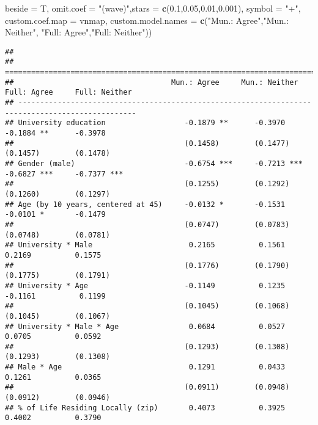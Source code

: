 \documentclass[
]{article}
\newenvironment{Shaded}{\begin{snugshade}}{\end{snugshade}}
\newcommand{\DataTypeTok}[1]{\textcolor[rgb]{0.13,0.29,0.53}{#1}}
\newcommand{\FloatTok}[1]{\textcolor[rgb]{0.00,0.00,0.81}{#1}}
\newcommand{\KeywordTok}[1]{\textcolor[rgb]{0.13,0.29,0.53}{\textbf{#1}}}
\newcommand{\NormalTok}[1]{#1}
\newcommand{\StringTok}[1]{\textcolor[rgb]{0.31,0.60,0.02}{#1}}
\begin{document}
\begin{Shaded}
\begin{Highlighting}[]
          \DataTypeTok{beside =}\NormalTok{ T,}
          \DataTypeTok{omit.coef =} \StringTok{"(wave)"}\NormalTok{,}\DataTypeTok{stars =} \KeywordTok{c}\NormalTok{(}\FloatTok{0.1}\NormalTok{,}\FloatTok{0.05}\NormalTok{,}\FloatTok{0.01}\NormalTok{,}\FloatTok{0.001}\NormalTok{), }\DataTypeTok{symbol =} \StringTok{"+"}\NormalTok{,}
          \DataTypeTok{custom.coef.map =}\NormalTok{ vnmap,}
          \DataTypeTok{custom.model.names =} \KeywordTok{c}\NormalTok{(}\StringTok{"Mun.: Agree"}\NormalTok{,}\StringTok{"Mun.: Neither"}\NormalTok{,}
                                 \StringTok{"Full: Agree"}\NormalTok{,}\StringTok{"Full: Neither"}\NormalTok{))}
\end{Highlighting}
\end{Shaded}

\begin{verbatim}
## 
## =================================================================================================
##                                    Mun.: Agree     Mun.: Neither   Full: Agree     Full: Neither 
## -------------------------------------------------------------------------------------------------
## University education                  -0.1879 **      -0.3970         -0.1884 **      -0.3978    
##                                       (0.1458)        (0.1477)        (0.1457)        (0.1478)   
## Gender (male)                         -0.6754 ***     -0.7213 ***     -0.6827 ***     -0.7377 ***
##                                       (0.1255)        (0.1292)        (0.1260)        (0.1297)   
## Age (by 10 years, centered at 45)     -0.0132 *       -0.1531         -0.0101 *       -0.1479    
##                                       (0.0747)        (0.0783)        (0.0748)        (0.0781)   
## University * Male                      0.2165          0.1561          0.2169          0.1575    
##                                       (0.1776)        (0.1790)        (0.1775)        (0.1791)   
## University * Age                      -0.1149          0.1235         -0.1161          0.1199    
##                                       (0.1045)        (0.1068)        (0.1045)        (0.1067)   
## University * Male * Age                0.0684          0.0527          0.0705          0.0592    
##                                       (0.1293)        (0.1308)        (0.1293)        (0.1308)   
## Male * Age                             0.1291          0.0433          0.1261          0.0365    
##                                       (0.0911)        (0.0948)        (0.0912)        (0.0946)   
## % of Life Residing Locally (zip)       0.4073          0.3925          0.4002          0.3790    

\end{verbatim}
\end{document}
